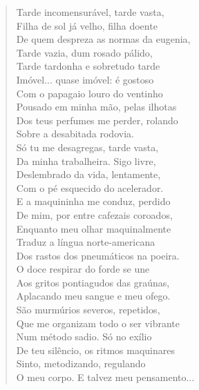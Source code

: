 \begin{verse}
Tarde incomensurável, tarde vasta,\\
Filha de sol já velho, filha doente\\
De quem despreza as normas da eugenia,\\
Tarde vazia, dum rosado pálido,\\
Tarde tardonha e sobretudo tarde\\
Imóvel... quase imóvel: é gostoso\\
Com o papagaio louro do ventinho\\
Pousado em minha mão, pelas ilhotas\\
Dos teus perfumes me perder, rolando\\
Sobre a desabitada rodovia.\\
Só tu me desagregas, tarde vasta,\\
Da minha trabalheira. Sigo livre,\\
Deslembrado da vida, lentamente,\\
Com o pé esquecido do acelerador.\\
E a maquininha me conduz, perdido\\
De mim, por entre cafezais coroados,\\
Enquanto meu olhar maquinalmente\\
Traduz a língua norte-americana\\
Dos rastos dos pneumáticos na poeira.\\
O doce respirar do forde se une\\
Aos gritos pontiagudos das graúnas,\\
Aplacando meu sangue e meu ofego.\\
São murmúrios severos, repetidos,\\
Que me organizam todo o ser vibrante\\
Num método sadio. Só no exílio\\
De teu silêncio, os ritmos maquinares\\
Sinto, metodizando, regulando\\
O meu corpo. E talvez meu pensamento...


\end{verse}
